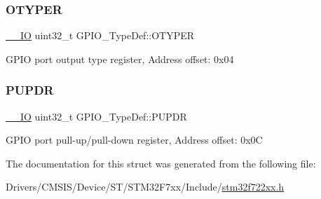 \subsubsection{\texorpdfstring{OTYPER}{OTYPER}}
{\footnotesize\ttfamily \mbox{\hyperlink{core__sc300_8h_aec43007d9998a0a0e01faede4133d6be}{\+\_\+\+\_\+\+IO}} uint32\+\_\+t G\+P\+I\+O\+\_\+\+Type\+Def\+::\+O\+T\+Y\+P\+ER}

G\+P\+IO port output type register, Address offset\+: 0x04 \mbox{\label{struct_g_p_i_o___type_def_a44ada3bfbe891e2efc1e06bda4c8014e}} 
\subsubsection{\texorpdfstring{PUPDR}{PUPDR}}
{\footnotesize\ttfamily \mbox{\hyperlink{core__sc300_8h_aec43007d9998a0a0e01faede4133d6be}{\+\_\+\+\_\+\+IO}} uint32\+\_\+t G\+P\+I\+O\+\_\+\+Type\+Def\+::\+P\+U\+P\+DR}

G\+P\+IO port pull-\/up/pull-\/down register, Address offset\+: 0x0C 

The documentation for this struct was generated from the following file\+:\begin{DoxyCompactItemize}
\item 
Drivers/\+C\+M\+S\+I\+S/\+Device/\+S\+T/\+S\+T\+M32\+F7xx/\+Include/\mbox{\hyperlink{stm32f722xx_8h}{stm32f722xx.\+h}}\end{DoxyCompactItemize}
